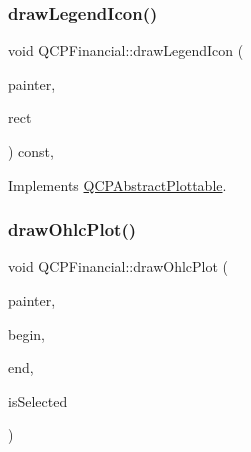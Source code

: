\mbox{\label{class_q_c_p_financial_a53f6ef2cddb650993f04c66e39a04942}} 
\subsubsection{\texorpdfstring{drawLegendIcon()}{drawLegendIcon()}}
{\footnotesize\ttfamily void Q\+C\+P\+Financial\+::draw\+Legend\+Icon (\begin{DoxyParamCaption}\item[{\mbox{\hyperlink{class_q_c_p_painter}{Q\+C\+P\+Painter}} $\ast$}]{painter,  }\item[{const Q\+RectF \&}]{rect }\end{DoxyParamCaption}) const\hspace{0.3cm}{\ttfamily [protected]}, {\ttfamily [virtual]}}



Implements \mbox{\hyperlink{class_q_c_p_abstract_plottable_a9a450783fd9ed539e589999fd390cdf7}{Q\+C\+P\+Abstract\+Plottable}}.

\mbox{\label{class_q_c_p_financial_a2c77aab636f6bce6e0407b3f94e90d08}} 
\subsubsection{\texorpdfstring{drawOhlcPlot()}{drawOhlcPlot()}}
{\footnotesize\ttfamily void Q\+C\+P\+Financial\+::draw\+Ohlc\+Plot (\begin{DoxyParamCaption}\item[{\mbox{\hyperlink{class_q_c_p_painter}{Q\+C\+P\+Painter}} $\ast$}]{painter,  }\item[{const \mbox{\hyperlink{class_q_c_p_data_container_ae40a91f5cb0bcac61d727427449b7d15}{Q\+C\+P\+Financial\+Data\+Container\+::const\+\_\+iterator}} \&}]{begin,  }\item[{const \mbox{\hyperlink{class_q_c_p_data_container_ae40a91f5cb0bcac61d727427449b7d15}{Q\+C\+P\+Financial\+Data\+Container\+::const\+\_\+iterator}} \&}]{end,  }\item[{bool}]{is\+Selected }\end{DoxyParamCaption})\hspace{0.3cm}{\ttfamily [protected]}}

